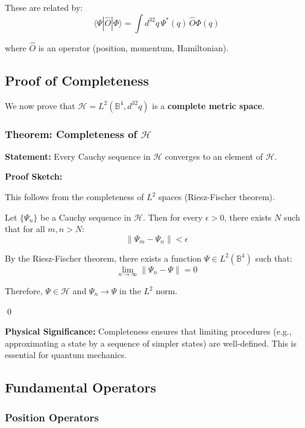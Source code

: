 These are related by:
\begin{equation}
\langle \Psi | \hat{O} | \Phi \rangle = \int d^{32}q \, \Psi^*(q) \, \hat{O}\Phi(q)
\end{equation}

where $\hat{O}$ is an operator (position, momentum, Hamiltonian).

\subsection{Proof of Completeness}

We now prove that $\mathcal{H} = L^2(\mathbb{B}^4, d^{32}q)$ is a \textbf{complete metric space}.

\subsubsection{Theorem: Completeness of $\mathcal{H}$}

\textbf{Statement:} Every Cauchy sequence in $\mathcal{H}$ converges to an element of $\mathcal{H}$.

\textbf{Proof Sketch:}

This follows from the completeness of $L^2$ spaces (Riesz-Fischer theorem). 

Let $\{\Psi_n\}$ be a Cauchy sequence in $\mathcal{H}$. Then for every $\epsilon > 0$, there exists $N$ such that for all $m, n > N$:
\begin{equation}
\|\Psi_m - \Psi_n\| < \epsilon
\end{equation}

By the Riesz-Fischer theorem, there exists a function $\Psi \in L^2(\mathbb{B}^4)$ such that:
\begin{equation}
\lim_{n \to \infty} \|\Psi_n - \Psi\| = 0
\end{equation}

Therefore, $\Psi \in \mathcal{H}$ and $\Psi_n \to \Psi$ in the $L^2$ norm.

\qed

\textbf{Physical Significance:} Completeness ensures that limiting procedures (e.g., approximating a state by a sequence of simpler states) are well-defined. This is essential for quantum mechanics.

\subsection{Fundamental Operators}

\subsubsection{Position Operators}


